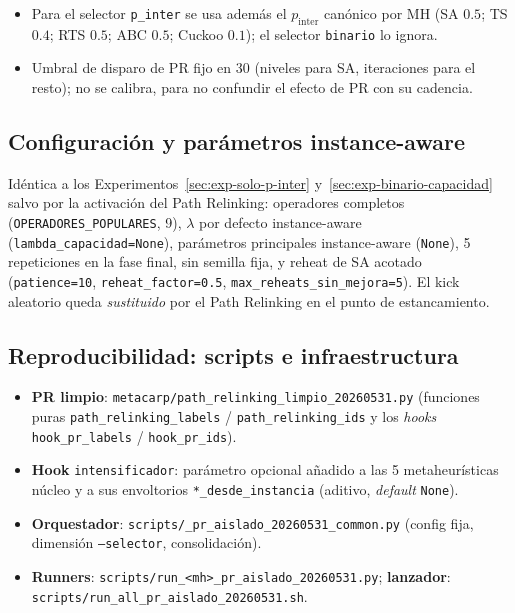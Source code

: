 \begin{itemize}
\item Para el selector \texttt{p\_inter} se usa además el $p_{\text{inter}}$
  canónico por MH (SA $0.5$; TS $0.4$; RTS $0.5$; ABC $0.5$; Cuckoo $0.1$);
  el selector \texttt{binario} lo ignora.
\item Umbral de disparo de PR fijo en $30$ (niveles para SA, iteraciones para el
  resto); no se calibra, para no confundir el efecto de PR con su cadencia.
\end{itemize}

\subsection{Configuración y parámetros instance-aware}

Idéntica a los Experimentos~\ref{sec:exp-solo-p-inter}
y~\ref{sec:exp-binario-capacidad} salvo por la activación del Path Relinking:
operadores completos (\texttt{OPERADORES\_POPULARES}, 9), $\lambda$ por defecto
instance-aware (\texttt{lambda\_capacidad=None}), parámetros principales
instance-aware (\texttt{None}), 5 repeticiones en la fase final, sin semilla
fija, y reheat de SA acotado (\texttt{patience=10}, \texttt{reheat\_factor=0.5},
\texttt{max\_reheats\_sin\_mejora=5}). El kick aleatorio queda \emph{sustituido}
por el Path Relinking en el punto de estancamiento.

\subsection{Reproducibilidad: scripts e infraestructura}

\begin{itemize}
\item \textbf{PR limpio}: \texttt{metacarp/path\_relinking\_limpio\_20260531.py}
  (funciones puras \texttt{path\_relinking\_labels} / \texttt{path\_relinking\_ids}
  y los \emph{hooks} \texttt{hook\_pr\_labels} / \texttt{hook\_pr\_ids}).
\item \textbf{Hook} \texttt{intensificador}: parámetro opcional añadido a las 5
  metaheurísticas núcleo y a sus envoltorios \texttt{*\_desde\_instancia}
  (aditivo, \emph{default} \texttt{None}).
\item \textbf{Orquestador}: \texttt{scripts/\_pr\_aislado\_20260531\_common.py}
  (config fija, dimensión \texttt{--selector}, consolidación).
\item \textbf{Runners}: \texttt{scripts/run\_<mh>\_pr\_aislado\_20260531.py};
  \textbf{lanzador}: \texttt{scripts/run\_all\_pr\_aislado\_20260531.sh}.
\end{itemize}

